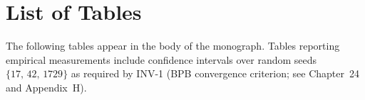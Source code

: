%
%

\chapter*{List of Tables}
\thispagestyle{plain}

\noindent
The following tables appear in the body of the monograph.
Tables reporting empirical measurements include confidence intervals
over random seeds \(\{17,\,42,\,1729\}\) as required by
INV-1 (BPB convergence criterion; see Chapter~24 and Appendix~H).

\bigskip

\listoftables
